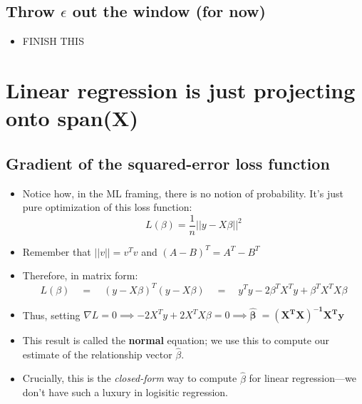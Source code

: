 \documentclass[11pt]{article}
\begin{document}
    \subsection{Throw $\epsilon$ out the window (for now)}
        \begin{itemize}
            \item FINISH THIS
        \end{itemize}

\section{Linear regression is just projecting onto span(X)}\label{sec:projection}
    \subsection{Gradient of the squared-error loss function}
        \begin{itemize}
            \item Notice how, in the ML framing, there is no notion of probability. It's just pure optimization of this loss function: \[L(\beta) = \frac{1}{n}||y - X\beta||^2\]
            \item Remember that $||v|| = v^Tv$ and $(A - B)^T = A^T - B^T$
            \item Therefore, in matrix form: $$L(\beta) \quad = \quad (y - X\beta)^T(y - X\beta) \quad = \quad y^Ty - 2\beta^TX^Ty + \beta^TX^TX\beta$$
            \item Thus, setting $\nabla L = 0 \implies -2X^Ty + 2X^TX\beta = 0 \implies \boldsymbol{\hat{\beta}} \; \mathbf{ = (X^TX)^{-1}X^Ty}$    
            \item This result is called the \textbf{normal} equation; we use this to compute our estimate of the relationship vector $\hat{\beta}$.
            \item Crucially, this is the \textit{closed-form} way to compute $\hat{\beta}$ for linear regression—we don't have such a luxury in logisitic regression.          
        \end{itemize}
\end{document}
